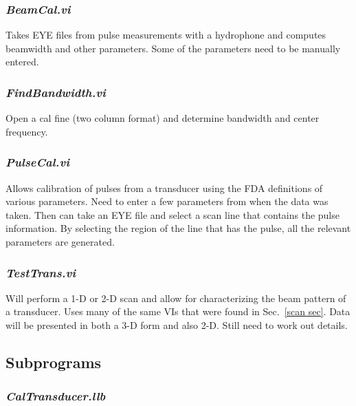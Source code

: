 \documentclass[10pt]{article}
\begin{document}
\subsubsection{{\it BeamCal.vi}}

Takes EYE files from pulse measurements with a hydrophone and
computes beamwidth and other parameters. Some of the parameters
need to be manually entered.

\subsubsection{{\it FindBandwidth.vi}}

Open a cal fine (two column format) and determine bandwidth and
center frequency.

\subsubsection{{\it PulseCal.vi}}

Allows calibration of pulses from a transducer using the FDA
definitions of various parameters. Need to enter a few parameters
from when the data was taken. Then can take an EYE file and select
a scan line that contains the pulse information. By selecting the
region of the line that has the pulse, all the relevant parameters
are generated.

\subsubsection{{\it TestTrans.vi}}

Will perform a 1-D or 2-D scan and allow for characterizing the
beam pattern of a transducer. Uses many of the same VIs that were
found in Sec.~\ref{scan sec}. Data will be presented in both a 3-D
form and also 2-D. Still need to work out details.

\subsection{Subprograms}

\subsubsection{{\it CalTransducer.llb}}
\end{document}
